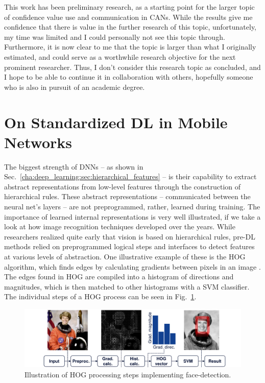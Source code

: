				This work has been preliminary research, as a starting point for the larger topic of confidence value use and communication in \acp{CAN}.
				While the results give me confidence that there is value in the further research of this topic, unfortunately, my time was limited and I could personally not see this topic through.
				Furthermore, it is now clear to me that the topic is larger than what I originally estimated, and could serve as a worthwhile research objective for the next prominent researcher.
				Thus, I don't consider this research topic as concluded, and I hope to be able to continue it in collaboration with others, hopefully someone who is also in pursuit of an academic degree.
				
		\section{On Standardized DL in Mobile Networks}
			\label{cha:imputation:sec:dl_standards}
			
		
			The biggest strength of \acp{DNN} -- as shown in Sec.~\ref{cha:deep_learning:sec:hierarchical_features} -- is their capability to extract abstract representations from low-level features through the construction of hierarchical rules.
			These abstract representations -- communicated between the neural net's layers -- are not preprogrammed, rather, learned during training.
			The importance of learned internal representations is very well illustrated, if we take a look at how image recognition techniques developed over the years.
			While researchers realized quite early that vision is based on hierarchical rules, pre-\ac{DL} methods relied on preprogrammed logical steps and interfaces to detect features at various levels of abstraction.
			One illustrative example of these is the \ac{HOG} algorithm, which finds edges by calculating gradients between pixels in an image \cite{hog}.
			The edges found in \ac{HOG} are compiled into a histogram of directions and magnitudes, which is then matched to other histograms with a \ac{SVM} classifier.
			The individual steps of a \ac{HOG} process can be seen in Fig.~\ref{fig:hog}.

			\begin{figure}[ht]
				\centering
				\includegraphics[width=\linewidth]{figures/12_imputation/hog/hog.pdf}
				\caption[Illustration of HOG processing steps implementing face-detection]{Illustration of HOG processing steps implementing face-detection\footnotemark.}
				\label{fig:hog}
			\end{figure}
			
